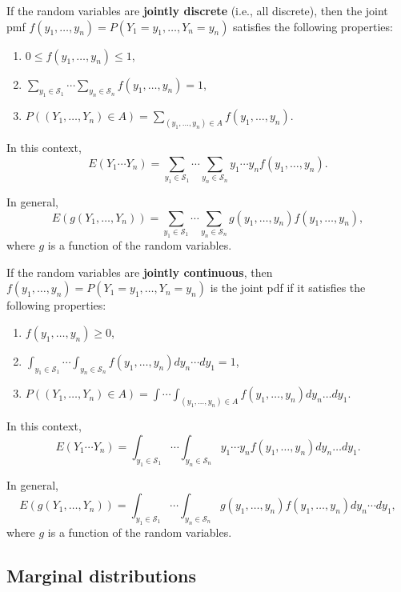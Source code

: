 \documentclass[
]{book}
\providecommand{\tightlist}{%
  \setlength{\itemsep}{0pt}\setlength{\parskip}{0pt}}
\theoremstyle{definition}
\theoremstyle{definition}
\theoremstyle{definition}
\theoremstyle{definition}
\theoremstyle{remark}
\begin{document}
If the random variables are \textbf{jointly discrete} (i.e., all discrete), then the joint pmf \(f(y_1,\ldots,y_n)=P(Y_1=y_1,\ldots,Y_n=y_n)\) satisfies the following properties:

\begin{enumerate}
\def\labelenumi{\arabic{enumi}.}
\tightlist
\item
  \(0\leq f(y_1,\ldots,y_n )\leq 1\),
\item
  \(\sum_{y_1\in\mathcal{S}_1}\cdots \sum_{y_n\in\mathcal{S}_n} f(y_1,\ldots,y_n ) = 1\),
\item
  \(P((Y_1,\ldots,Y_n)\in A)=\sum_{(y_1,\ldots,y_n) \in A} f(y_1,\ldots,y_n)\).
\end{enumerate}

In this context,
\[
E(Y_1 \cdots Y_n)=\sum_{y_1\in\mathcal{S}_1} \cdots \sum_{y_n\in\mathcal{S}_n}y_1 \cdots y_n  f(y_1,\ldots,y_n).
\]

In general,
\[
E(g(Y_1,\ldots,Y_n))=\sum_{y_1\in\mathcal{S}_1} \cdots \sum_{y_n\in\mathcal{S}_n} g(y_1, \ldots, y_n) f(y_1,\ldots,y_n),
\]
where \(g\) is a function of the random variables.

If the random variables are \textbf{jointly continuous}, then \(f(y_1,\ldots,y_n)=P(Y_1=y_1,\ldots,Y_n=y_n)\) is the joint pdf if it satisfies the following properties:

\begin{enumerate}
\def\labelenumi{\arabic{enumi}.}
\tightlist
\item
  \(f(y_1,\ldots,y_n ) \geq 0\),
\item
  \(\int_{y_1\in\mathcal{S}_1}\cdots \int_{y_n\in\mathcal{S}_n} f(y_1,\ldots,y_n ) dy_n \cdots dy_1 = 1\),
\item
  \(P((Y_1,\ldots,Y_n)\in A)=\int \cdots \int_{(y_1,\ldots,y_n) \in A} f(y_1,\ldots,y_n) dy_n\ldots dy_1\).
\end{enumerate}

In this context,
\[
E(Y_1 \cdots Y_n)=\int_{y_1\in\mathcal{S}_1} \cdots \int_{y_n\in\mathcal{S}_n} y_1 \cdots y_n  f(y_1,\ldots,y_n) dy_n \ldots dy_1.
\]

In general,
\[
E(g(Y_1,\ldots,Y_n))=\int_{y_1\in\mathcal{S}_1} \cdots \int_{y_n\in\mathcal{S}_n} g(y_1, \ldots, y_n) f(y_1,\ldots,y_n) dy_n \cdots dy_1,
\]
where \(g\) is a function of the random variables.

\hypertarget{marginal-distributions}{%
\subsection{Marginal distributions}\label{marginal-distributions}}
\end{document}

